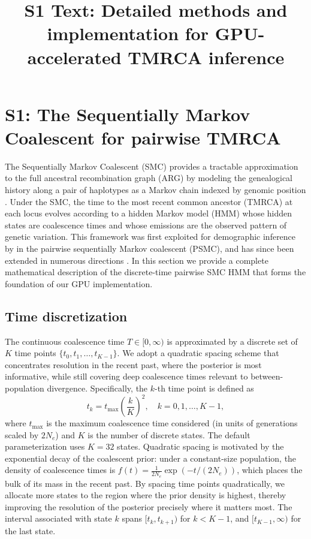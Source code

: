 \documentclass[10pt,letterpaper]{article}
\title{S1 Text: Detailed methods and implementation for GPU-accelerated TMRCA inference}
\author{}
\date{}
\begin{document}
\maketitle

\section{S1: The Sequentially Markov Coalescent for pairwise TMRCA}

The Sequentially Markov Coalescent (SMC) provides a tractable approximation to the full ancestral recombination graph (ARG) by modeling the genealogical history along a pair of haplotypes as a Markov chain indexed by genomic position \citep{McVean2005}. Under the SMC, the time to the most recent common ancestor (TMRCA) at each locus evolves according to a hidden Markov model (HMM) whose hidden states are coalescence times and whose emissions are the observed pattern of genetic variation. This framework was first exploited for demographic inference by \citet{Li2011} in the pairwise sequentially Markov coalescent (PSMC), and has since been extended in numerous directions \citep{Schiffels2014, Terhorst2017, Schiffels2020}. In this section we provide a complete mathematical description of the discrete-time pairwise SMC HMM that forms the foundation of our GPU implementation.

\subsection{Time discretization}

The continuous coalescence time $T \in [0, \infty)$ is approximated by a discrete set of $K$ time points $\{t_0, t_1, \ldots, t_{K-1}\}$. We adopt a quadratic spacing scheme that concentrates resolution in the recent past, where the posterior is most informative, while still covering deep coalescence times relevant to between-population divergence. Specifically, the $k$-th time point is defined as
\begin{equation}
t_k = t_{\max} \left(\frac{k}{K}\right)^2, \quad k = 0, 1, \ldots, K-1,
\label{eq:time_discretization}
\end{equation}
where $t_{\max}$ is the maximum coalescence time considered (in units of generations scaled by $2N_e$) and $K$ is the number of discrete states. The default parameterization uses $K = 32$ states. Quadratic spacing is motivated by the exponential decay of the coalescent prior: under a constant-size population, the density of coalescence times is $f(t) = \frac{1}{2N_e} \exp(-t/(2N_e))$, which places the bulk of its mass in the recent past. By spacing time points quadratically, we allocate more states to the region where the prior density is highest, thereby improving the resolution of the posterior precisely where it matters most. The interval associated with state $k$ spans $[t_k, t_{k+1})$ for $k < K-1$, and $[t_{K-1}, \infty)$ for the last state.
\end{document}
